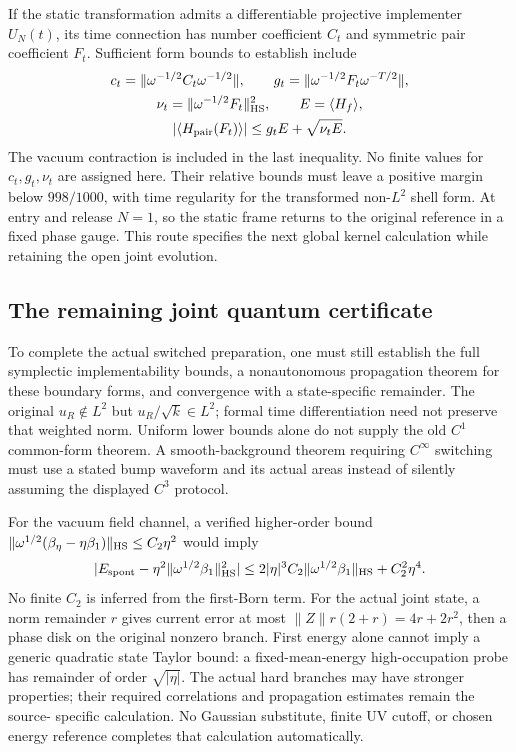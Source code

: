If the static transformation admits a differentiable projective implementer
$U_N(t)$, its time connection has number coefficient $C_t$ and symmetric
pair coefficient $F_t$. Sufficient form bounds to establish include
\[
 \begin{gathered}
 c_t=\|\omega^{-1/2}C_t\omega^{-1/2}\|,\qquad
 g_t=\|\omega^{-1/2}F_t\omega^{-T/2}\|,\\
 \nu_t=\|\omega^{-1/2}F_t\|_{\rm HS}^2,\qquad E=\langle H_f\rangle,\\
 |\langle H_{\rm pair}(F_t)\rangle|
       \le g_tE+\sqrt{\nu_t E}.
 \end{gathered}
\]
The vacuum contraction is included in the last inequality. No finite values
for $c_t,g_t,\nu_t$ are assigned here. Their relative bounds must leave a
positive margin below $998/1000$, with time regularity for the transformed
non-$L^2$ shell form. At entry and release $N=1$, so the static frame returns
to the original reference in a fixed phase gauge. This route specifies the
next global kernel calculation while retaining the open joint evolution.

\subsection{The remaining joint quantum certificate}
To complete the actual switched preparation, one must still establish the
full symplectic implementability bounds, a nonautonomous propagation theorem
for these boundary forms, and convergence with a state-specific remainder.
The original $u_R\notin L^2$ but $u_R/\sqrt k\in L^2$; formal time
differentiation need not preserve that weighted norm. Uniform lower bounds
alone do not supply the old $C^1$ common-form theorem. A smooth-background
theorem requiring $C^\infty$ switching must use a stated bump waveform and
its actual areas instead of silently assuming the displayed $C^3$ protocol.

For the vacuum field channel, a verified higher-order bound
$\|\omega^{1/2}(\beta_\eta-\eta\beta_1)\|_{\rm HS}\le C_2\eta^2$
would imply
\[
 |E_{\rm spont}-\eta^2\|\omega^{1/2}\beta_1\|_{\rm HS}^2|
 \le2|\eta|^3C_2\|\omega^{1/2}\beta_1\|_{\rm HS}+C_2^2\eta^4.
\]
No finite $C_2$ is inferred from the first-Born term. For the actual joint
state, a norm remainder $r$ gives current error at most
$\|Z\|r(2+r)=4r+2r^2$, then a phase disk on the original nonzero branch.
First energy alone cannot imply a generic quadratic state Taylor bound:
a fixed-mean-energy high-occupation probe has remainder of order
$\sqrt{|\eta|}$.  The actual hard branches may have stronger properties;
their required correlations and propagation estimates remain the source-
specific calculation. No Gaussian substitute, finite UV cutoff, or chosen
energy reference completes that calculation automatically.
